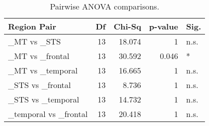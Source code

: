\begin{table}[h]
\centering
\begin{tabular}{lrrrl}
\toprule
 Region Pair           &   Df &   Chi-Sq &   p-value & Sig.   \\
\midrule
 \_MT vs \_STS           &   13 &   18.074 &     1     & n.s.   \\
 \_MT vs \_frontal       &   13 &   30.592 &     0.046 & *      \\
 \_MT vs \_temporal      &   13 &   16.665 &     1     & n.s.   \\
 \_STS vs \_frontal      &   13 &    8.736 &     1     & n.s.   \\
 \_STS vs \_temporal     &   13 &   14.732 &     1     & n.s.   \\
 \_temporal vs \_frontal &   13 &   20.418 &     1     & n.s.   \\
\bottomrule
\end{tabular}
\caption{Pairwise ANOVA comparisons.}
\end{table}